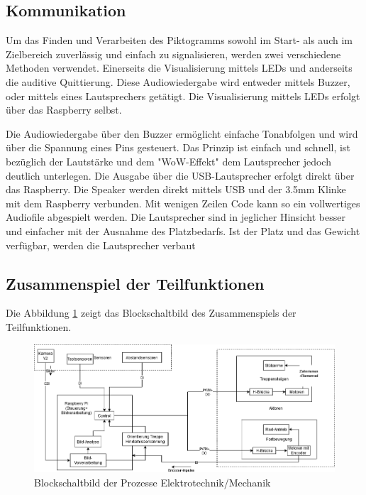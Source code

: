 \subsection {Kommunikation}

Um das Finden und Verarbeiten des Piktogramms sowohl im Start- als auch im Zielbereich zuverlässig und einfach zu signalisieren, werden zwei verschiedene Methoden verwendet. Einerseits die Visualisierung mittels LEDs und anderseits die auditive Quittierung. Diese Audiowiedergabe wird entweder mittels Buzzer, oder mittels eines Lautsprechers getätigt. Die Visualisierung mittels LEDs erfolgt über das Raspberry selbst.

Die Audiowiedergabe über den Buzzer ermöglicht einfache Tonabfolgen und wird über die Spannung eines Pins gesteuert. Das Prinzip ist einfach und schnell, ist bezüglich der Lautstärke und dem "WoW-Effekt" dem Lautsprecher jedoch deutlich unterlegen.
Die Ausgabe über die USB-Lautsprecher erfolgt direkt über das Raspberry. Die Speaker werden direkt mittels USB und der 3.5mm Klinke mit dem Raspberry verbunden. Mit wenigen Zeilen Code kann so ein vollwertiges Audiofile abgespielt werden.
Die Lautsprecher sind in jeglicher Hinsicht besser und einfacher mit der Ausnahme des Platzbedarfs. Ist der Platz und das Gewicht verfügbar, werden die Lautsprecher verbaut 

\newpage
\subsection{Zusammenspiel der Teilfunktionen}
 Die Abbildung \ref{fig3} zeigt das Blockschaltbild des Zusammenspiels der Teilfunktionen.

\begin{figure}[h]
  \includegraphics[width=\textwidth]{img/Funktionsmuster Treppensteigen/Blockschaltbild.png}
  \centering
  \caption{Blockschaltbild der Prozesse Elektrotechnik/Mechanik}
  \label{fig3}
\end{figure}

